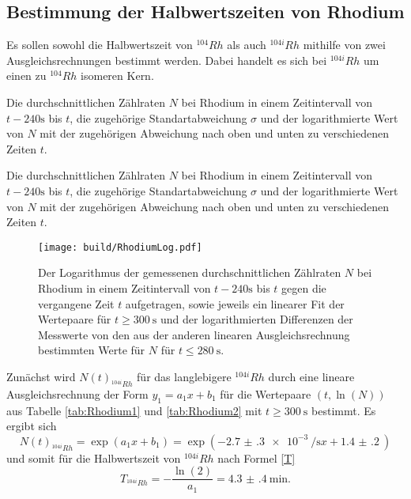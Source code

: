 \subsection{Bestimmung der Halbwertszeiten von Rhodium}
Es sollen sowohl die Halbwertszeit von $^{104} Rh$ als auch $^{104i} Rh$ mithilfe von zwei Ausgleichsrechnungen bestimmt werden. Dabei handelt es sich bei $^{104i} Rh$ um einen zu $^{104} Rh$ isomeren Kern.
 \begin{table}
	\centering
	\caption{Die durchschnittlichen Zählraten $N$ bei Rhodium in einem Zeitintervall von $t-240\si{\second}$ bis $t$, die zugehörige Standartabweichung $\sigma$ und der logarithmierte Wert von $N$ mit der zugehörigen Abweichung nach oben und unten zu verschiedenen Zeiten $t$.}
	
\end{table}
\begin{table}
	\centering
	\caption{Die durchschnittlichen Zählraten $N$ bei Rhodium in einem Zeitintervall von $t-240\si{\second}$ bis $t$, die zugehörige Standartabweichung $\sigma$ und der logarithmierte Wert von $N$ mit der zugehörigen Abweichung nach oben und unten zu verschiedenen Zeiten $t$.}
	
\end{table}
\begin{figure}
	\centering
	\caption{Der Logarithmus der gemessenen durchschnittlichen Zählraten $N$ bei Rhodium in einem Zeitintervall von $t-240\si{\second}$ bis $t$ gegen die vergangene Zeit $t$ aufgetragen, sowie jeweils ein linearer Fit der Wertepaare für $t\ge \SI{300}{\second}$ und der logarithmierten Differenzen der Messwerte von den aus der anderen linearen Ausgleichsrechnung bestimmten Werte für $N$ für $t\le \SI{280}{\second}$.}
	\texttt{[image: build/RhodiumLog.pdf]}
	\label{fig:Rhodium}
\end{figure}
Zunächst wird $N(t)_{^{104i}Rh}$ für das langlebigere $^{104i} Rh$ durch eine lineare Ausgleichsrechnung der Form $y_1=a_1 x+b_1$ für die Wertepaare $(t,\ln(N))$ aus Tabelle \ref{tab:Rhodium1} und \ref{tab:Rhodium2} mit $t\ge \SI{300}{\second}$ bestimmt.
Es ergibt sich
\begin{equation}
	N(t)_{^{104i}Rh} = \exp\left(a_1 x + b_1\right) = \exp\left(-\SI{2.7(3)e-3}{\per\second} x + \SI{1.4(2)}{}\right)
\end{equation}
und somit für die Halbwertszeit von $^{104i} Rh$ nach Formel \eqref{T}
\begin{equation}
	T_{^{104i}Rh} = -\frac{\ln(2)}{a_1}=\SI{4.3(4)}{\minute}\text{.}
\end{equation}
